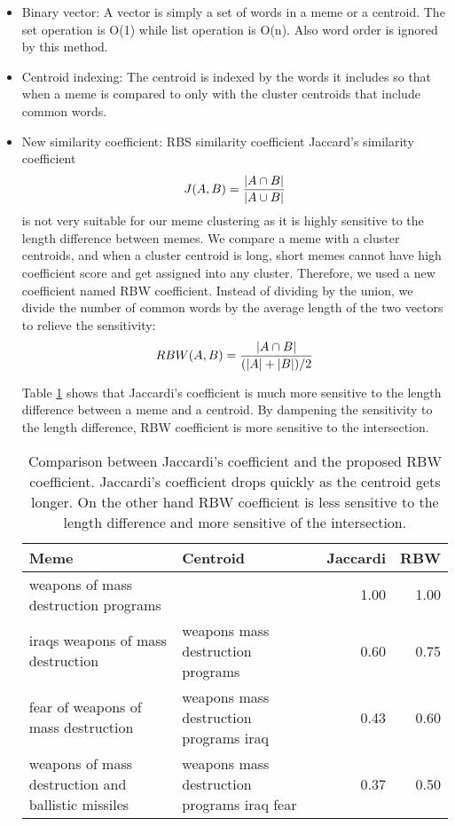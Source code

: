 \documentclass{sig-alternate}
\begin{document}
\begin{itemize}
 \item Binary vector: A vector is simply a set of words in a meme or a centroid. The set operation is O(1) while list operation is O(n). Also word order is ignored by this method.
 \item Centroid indexing: The centroid is indexed by the words it includes so that when a meme is compared to only with the cluster centroids that include common words.
 \item New similarity coefficient: RBS similarity coefficient
 Jaccard's similarity coefficient 
\begin{displaymath} 
 J(A,B) = {{|A \cap B|}\over{|A \cup B|}}
\end{displaymath} 
  is not very suitable for our meme clustering as it is highly sensitive to the length difference between memes. We compare a meme with a cluster centroids, and when a cluster centroid is long, short memes cannot have high coefficient score and get assigned into any cluster. Therefore, we used a new coefficient named RBW coefficient. Instead of dividing by the union, we divide the number of common words by the average length of the two vectors to relieve the sensitivity:\\
\begin{displaymath}
RBW(A, B) = {{|A \cap B|} \over {(|A|+|B|) / 2} }
\end{displaymath}

Table \ref{table:sim} shows that Jaccardi's coefficient is much more sensitive to the length difference between a meme and a centroid. By dampening the sensitivity to the length difference, RBW coefficient is more sensitive to the intersection. 

\begin{table}[h!t!]
\begin{center}
\begin{tabular}{p{3.0cm}|p{2.2cm}|r|r}
\hline
Meme&Centroid&Jaccardi&RBW\\
\hline
weapons of mass destruction programs&&1.00&1.00\\
\hline
iraqs weapons of mass destruction & weapons mass destruction programs&0.60&0.75\\
\hline
fear of weapons of mass destruction & weapons mass destruction programs iraq&0.43&0.60\\
\hline
weapons of mass destruction and ballistic missiles&weapons mass destruction programs iraq fear&0.37&0.50\\
\hline
\end{tabular}
\caption{Comparison between Jaccardi's coefficient and the proposed RBW coefficient. Jaccardi's coefficient drops quickly as the centroid gets longer. On the other hand RBW coefficient is less sensitive to the length difference and more sensitive of the intersection.}
\label{table:sim}
\end{center}
\end{table}


\end{itemize}
\end{document}
